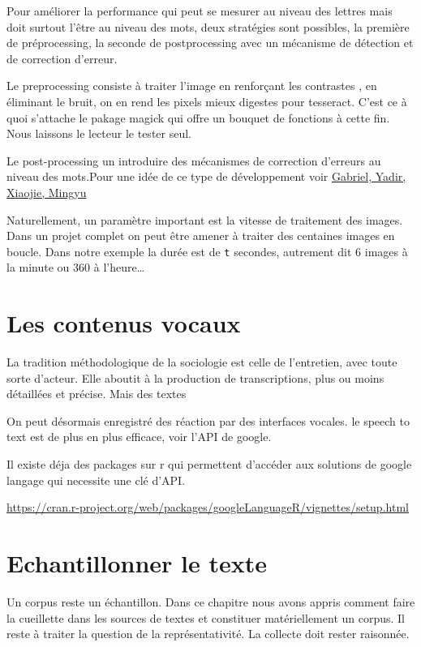 \documentclass[
]{book}
\begin{document}
Pour améliorer la performance qui peut se mesurer au niveau des lettres mais doit surtout l'être au niveau des mots, deux stratégies sont possibles, la première de préprocessing, la seconde de postprocessing avec un mécanisme de détection et de correction d'erreur.

Le preprocessing consiste à traiter l'image en renforçant les contrastes , en éliminant le bruit, on en rend les pixels mieux digestes pour tesseract. C'est ce à quoi s'attache le pakage magick qui offre un bouquet de fonctions à cette fin. Nous laissons le lecteur le tester seul.

Le post-processing un introduire des mécanismes de correction d'erreurs au niveau des mots.Pour une idée de ce type de développement voir \href{https://gabriben.github.io/NLP.html}{Gabriel, Yadir, Xiaojie, Mingyu}

Naturellement, un paramètre important est la vitesse de traitement des images. Dans un projet complet on peut être amener à traiter des centaines images en boucle. Dans notre exemple la durée est de \texttt{t} secondes, autrement dit 6 images à la minute ou 360 à l'heure\ldots{}

\hypertarget{les-contenus-vocaux}{%
\section{Les contenus vocaux}\label{les-contenus-vocaux}}

La tradition méthodologique de la sociologie est celle de l'entretien, avec toute sorte d'acteur. Elle aboutit à la production de transcriptions, plus ou moins détaillées et précise. Mais des textes

On peut désormais enregistré des réaction par des interfaces vocales. le speech to text est de plus en plus efficace, voir l'API de google.

Il existe déja des packages sur r qui permettent d'accéder aux solutions de google langage qui necessite une clé d'API.

\url{https://cran.r-project.org/web/packages/googleLanguageR/vignettes/setup.html}

\hypertarget{echantillonner-le-texte}{%
\section{Echantillonner le texte}\label{echantillonner-le-texte}}

Un corpus reste un échantillon. Dans ce chapitre nous avons appris comment faire la cueillette dans les sources de textes et constituer matériellement un corpus. Il reste à traiter la question de la représentativité. La collecte doit rester raisonnée.
\end{document}
